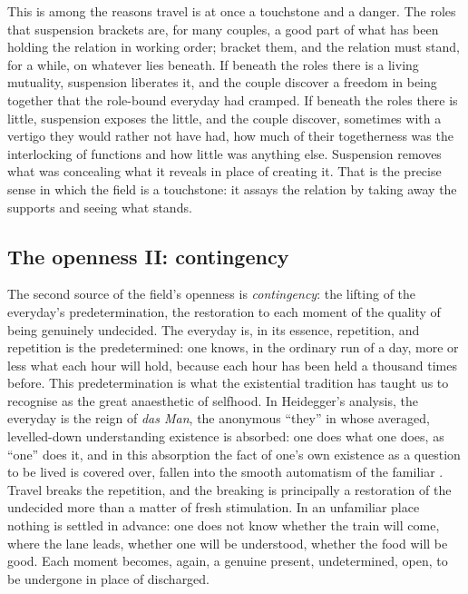 This is among the reasons travel is at once a touchstone and a danger. The roles that suspension brackets are, for many couples, a good part of what has been holding the relation in working order; bracket them, and the relation must stand, for a while, on whatever lies beneath. If beneath the roles there is a living mutuality, suspension liberates it, and the couple discover a freedom in being together that the role-bound everyday had cramped. If beneath the roles there is little, suspension exposes the little, and the couple discover, sometimes with a vertigo they would rather not have had, how much of their togetherness was the interlocking of functions and how little was anything else. Suspension removes what was concealing what it reveals in place of creating it. That is the precise sense in which the field is a touchstone: it assays the relation by taking away the supports and seeing what stands.

\subsection{The openness II: contingency}
\label{p21:sub:field-contingency}

The second source of the field's openness is \emph{contingency}: the lifting of the everyday's predetermination, the restoration to each moment of the quality of being genuinely undecided. The everyday is, in its essence, repetition, and repetition is the predetermined: one knows, in the ordinary run of a day, more or less what each hour will hold, because each hour has been held a thousand times before. This predetermination is what the existential tradition has taught us to recognise as the great anaesthetic of selfhood. In Heidegger's analysis, the everyday is the reign of \emph{das Man}, the anonymous ``they'' in whose averaged, levelled-down understanding existence is absorbed: one does what one does, as ``one'' does it, and in this absorption the fact of one's own existence as a question to be lived is covered over, fallen into the smooth automatism of the familiar \parencite{heidegger1962b}. Travel breaks the repetition, and the breaking is principally a restoration of the undecided more than a matter of fresh stimulation. In an unfamiliar place nothing is settled in advance: one does not know whether the train will come, where the lane leads, whether one will be understood, whether the food will be good. Each moment becomes, again, a genuine present, undetermined, open, to be undergone in place of discharged.

